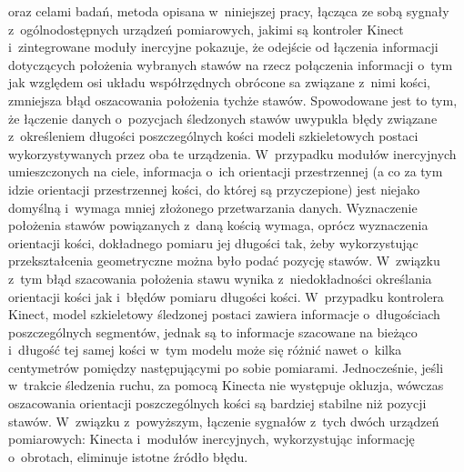 oraz celami badań, metoda opisana w~niniejszej pracy, łącząca ze sobą sygnały z~ogólnodostępnych urządzeń pomiarowych, jakimi są kontroler Kinect i~zintegrowane moduły inercyjne pokazuje, że odejście od łączenia informacji dotyczących położenia wybranych stawów na rzecz połączenia informacji o~tym jak względem osi układu współrzędnych obrócone sa związane z~nimi kości, zmniejsza błąd oszacowania położenia tychże stawów. Spowodowane jest to tym, że łączenie danych o~pozycjach śledzonych stawów uwypukla błędy związane z~określeniem długości poszczególnych kości modeli szkieletowych postaci wykorzystywanych przez oba te urządzenia. W~przypadku modułów inercyjnych umieszczonych na ciele, informacja o~ich orientacji przestrzennej (a co za tym idzie orientacji przestrzennej kości, do której są przyczepione) jest niejako domyślną i~wymaga mniej złożonego przetwarzania danych. Wyznaczenie położenia stawów powiązanych z~daną kością wymaga, oprócz wyznaczenia orientacji kości, dokładnego pomiaru jej długości tak, żeby wykorzystując przekształcenia geometryczne można było podać pozycję stawów. W~związku z~tym błąd szacowania położenia stawu wynika z~niedokładności określania orientacji kości jak i~błędów pomiaru długości kości. W~przypadku kontrolera Kinect, model szkieletowy śledzonej postaci zawiera informacje o~długościach poszczególnych segmentów, jednak są to informacje szacowane na bieżąco i~długość tej samej kości w~tym modelu może się różnić nawet o~kilka centymetrów pomiędzy następującymi po sobie pomiarami. Jednocześnie, jeśli w~trakcie śledzenia ruchu, za pomocą Kinecta nie występuje okluzja, wówczas oszacowania orientacji poszczególnych kości są bardziej stabilne niż pozycji stawów. W~związku z~powyższym, łączenie sygnałów z~tych dwóch urządzeń pomiarowych: Kinecta i~modułów inercyjnych, wykorzystując informację o~obrotach, eliminuje istotne źródło błędu.\\

